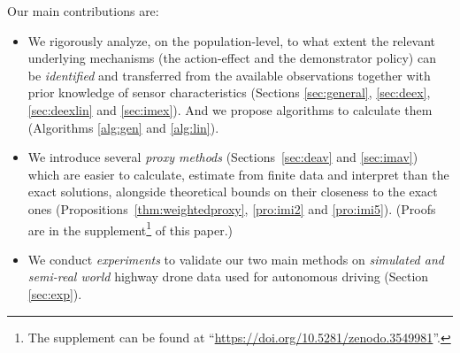 \documentclass[letterpaper]{article} %
\theoremstyle{definition}%
\theoremstyle{definition}
\begin{document}
Our main contributions are: %
\begin{itemize}

\item We rigorously analyze, on the population-level, %
to what extent the relevant underlying mechanisms (the action-effect and the demonstrator policy) can be \emph{identified} and transferred from the available observations together with prior knowledge of sensor characteristics (Sections \ref{sec:general}, \ref{sec:deex}, \ref{sec:deexlin} and \ref{sec:imex}). And we propose algorithms to calculate them (Algorithms \ref{alg:gen} and \ref{alg:lin}). %


\item We introduce several \emph{proxy methods} (Sections~\ref{sec:deav} and \ref{sec:imav}) which are easier to calculate, estimate from finite data and interpret than the exact solutions, alongside theoretical bounds on their closeness to the exact ones %
(Propositions~\ref{thm:weightedproxy}, \ref{pro:imi2} and \ref{pro:imi5}). (Proofs are in the supplement\footnote{The supplement can be found at ``\url{https://doi.org/10.5281/zenodo.3549981}''.} of this paper.) %
\item We conduct \emph{experiments} to validate our two main methods on \emph{simulated and semi-real world} highway drone data used for autonomous driving (Section \ref{sec:exp}). 

\end{itemize}
\end{document}
